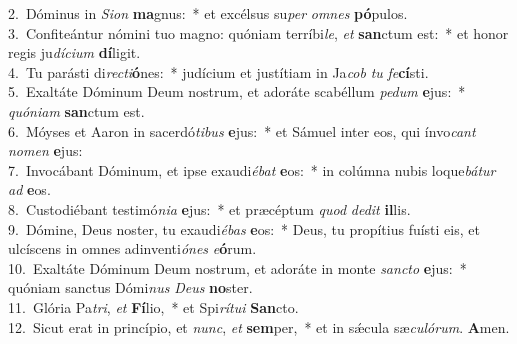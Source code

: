 {2.~}Dóminus in \textit{Si}\textit{on} \textbf{ma}gnus:~* et excélsus su\textit{per} \textit{om}\textit{nes} \textbf{pó}pulos.\\
{3.~}Confiteántur nómini tuo magno: quóniam terríbi\textit{le}, \textit{et} \textbf{san}ctum est:~* et honor regis ju\textit{dí}\textit{ci}\textit{um} \textbf{dí}ligit.\\
{4.~}Tu parásti di\textit{re}\textit{cti}\textbf{ó}nes:~* judícium et justítiam in Ja\textit{cob} \textit{tu} \textit{fe}\textbf{cí}sti.\\
{5.~}Exaltáte Dóminum Deum nostrum, et adoráte scabéllum \textit{pe}\textit{dum} \textbf{e}jus:~* \textit{quó}\textit{ni}\textit{am} \textbf{san}ctum est.\\
{6.~}Móyses et Aaron in sacerdó\textit{ti}\textit{bus} \textbf{e}jus:~* et Sámuel inter eos, qui ínvo\textit{cant} \textit{no}\textit{men} \textbf{e}jus:\\
{7.~}Invocábant Dóminum, et ipse exaudi\textit{é}\textit{bat} \textbf{e}os:~* in colúmna nubis loque\textit{bá}\textit{tur} \textit{ad} \textbf{e}os.\\
{8.~}Custodiébant testimó\textit{ni}\textit{a} \textbf{e}jus:~* et præcéptum \textit{quod} \textit{de}\textit{dit} \textbf{il}lis.\\
{9.~}Dómine, Deus noster, tu exaudi\textit{é}\textit{bas} \textbf{e}os:~* Deus, tu propítius fuísti eis, et ulcíscens in omnes adinventi\textit{ó}\textit{nes} \textit{e}\textbf{ó}rum.\\
{10.~}Exaltáte Dóminum Deum nostrum, et adoráte in monte \textit{san}\textit{cto} \textbf{e}jus:~* quóniam sanctus Dómi\textit{nus} \textit{De}\textit{us} \textbf{no}ster.\\
{11.~}Glória Pa\textit{tri}, \textit{et} \textbf{Fí}lio,~* et Spi\textit{rí}\textit{tu}\textit{i} \textbf{San}cto.\\
{12.~}Sicut erat in princípio, et \textit{nunc}, \textit{et} \textbf{sem}per,~* et in sǽcula sæ\textit{cu}\textit{ló}\textit{rum}. \textbf{A}men.\\
